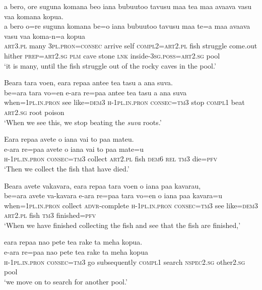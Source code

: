 \ea\label{ex:text30-16}
a bero, ore suguna komana beo iana bubuutoo tavusu maa tea maa avaava vasu vaa komana kopua.\\
\gll a	bero	o=re	suguna	komana	be=o	iana	bubuutoo	tavusu	maa	te=a	maa	avaava	vasu	vaa	koma-n=a	kopua\\
     \textsc{art}3.\textsc{pl}	many	3\textsc{pl}.\textsc{pron}=\textsc{consec}	arrive	self	\textsc{compl}2=\textsc{art}2.\textsc{pl}	fish	struggle	come.out	hither	\textsc{prep}=\textsc{art}2.\textsc{sg}	\textsc{plm}	cave	stone	\textsc{lnk}	inside-3\textsc{sg}.\textsc{poss}=\textsc{art}2.\textsc{sg}	pool\\
\glt `it is many, until the fish struggle out of the rocky caves in the pool.'
\z

\newpage
\ea\label{ex:text30-17}
Beara tara voen, eara repaa antee tea tasu a ana suva.\\
\gll be=ara	tara	vo=en	e-ara	re=paa	antee	tea	tasu	a	ana	suva\\
     when=1\textsc{pl}.\textsc{in}.\textsc{pron}	see	like=\textsc{dem}3	\textsc{h}-1\textsc{pl}.\textsc{in}.\textsc{pron}	\textsc{consec}=\textsc{tm}3	stop	\textsc{compl}1	beat	\textsc{art}2.\textsc{sg}	root	poison\\
\glt `When we see this, we stop beating the \textit{suva} roots.'
\z

\ea\label{ex:text30-18}
Eara repaa avete o iana vai to paa mateu.\\
\gll e-ara	re=paa	avete	o	iana	vai	to	paa	mate=u\\
     \textsc{h}-1\textsc{pl}.\textsc{in}.\textsc{pron}	\textsc{consec}=\textsc{tm}3	collect	\textsc{art}2.\textsc{pl}	fish	\textsc{dem}6	\textsc{rel}	\textsc{tm}3	die=\textsc{pfv}\\
\glt `Then we collect the fish that have died.'
\z

\ea\label{ex:text30-19}
Beara avete vakavara, eara repaa tara voen o iana paa kavarau,\\
\gll be=ara	avete	va-kavara	e-ara	re=paa	tara	vo=en	o	iana	paa	kavara=u\\
     when=1\textsc{pl}.\textsc{in}.\textsc{pron}	collect	\textsc{advr}-complete	\textsc{h}-1\textsc{pl}.\textsc{in}.\textsc{pron}	\textsc{consec}=\textsc{tm}3	see	like=\textsc{dem}3	\textsc{art}2.\textsc{pl}	fish	\textsc{tm}3	finished=\textsc{pfv}\\
\glt `When we have finished collecting the fish and see that the fish are finished,'
\z

\ea\label{ex:text30-20}
eara repaa nao pete tea rake ta meha kopua.\\
\gll e-ara	re=paa	nao	pete	tea	rake	ta	meha	kopua\\
     \textsc{h}-1\textsc{pl}.\textsc{in}.\textsc{pron}	\textsc{consec}=\textsc{tm}3	go	subsequently	\textsc{compl}1	search	\textsc{nspec}2.\textsc{sg}	other2.\textsc{sg}	pool\\
\glt `we move on to search for another pool.'
\z
